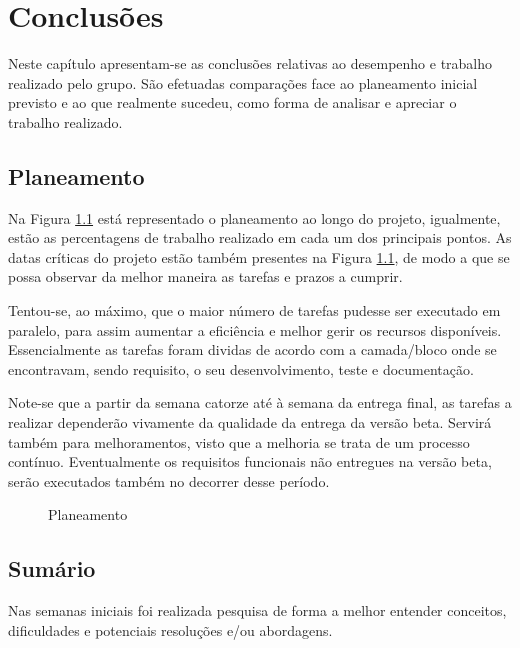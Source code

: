 %
%
\chapter{Conclusões} \label{cap4}

Neste capítulo apresentam-se as conclusões relativas ao desempenho e trabalho realizado pelo grupo. São efetuadas comparações face ao planeamento inicial previsto e ao que realmente sucedeu, como forma de analisar e apreciar o trabalho realizado.

\section{Planeamento}\label{sec41}

Na Figura \ref{planning} está representado o planeamento ao longo do projeto, igualmente, estão as percentagens de trabalho realizado em cada um dos principais pontos. As datas críticas do projeto estão também presentes na Figura \ref{planning}, de modo a que se possa observar da melhor maneira as tarefas e prazos a cumprir.

Tentou-se, ao máximo, que o maior número de tarefas pudesse ser executado em paralelo, para assim aumentar a eficiência e melhor gerir os recursos disponíveis. Essencialmente as tarefas foram dividas de acordo com a camada/bloco onde se encontravam, sendo requisito, o seu desenvolvimento, teste e documentação.


Note-se que a partir da semana catorze até à semana da entrega final, as tarefas a realizar dependerão vivamente da qualidade da entrega da versão beta. Servirá também para melhoramentos, visto que a melhoria se trata de um processo contínuo. Eventualmente os requisitos funcionais não entregues na versão beta, serão executados também no decorrer desse período.
 

\begin{figure}
	\hspace{-1.75cm}
	\caption{Planeamento}
	\label{planning}
\end{figure}

\section{Sumário}\label{sec42}

Nas semanas iniciais foi realizada pesquisa de forma a melhor entender conceitos, dificuldades e potenciais resoluções e/ou abordagens. 

